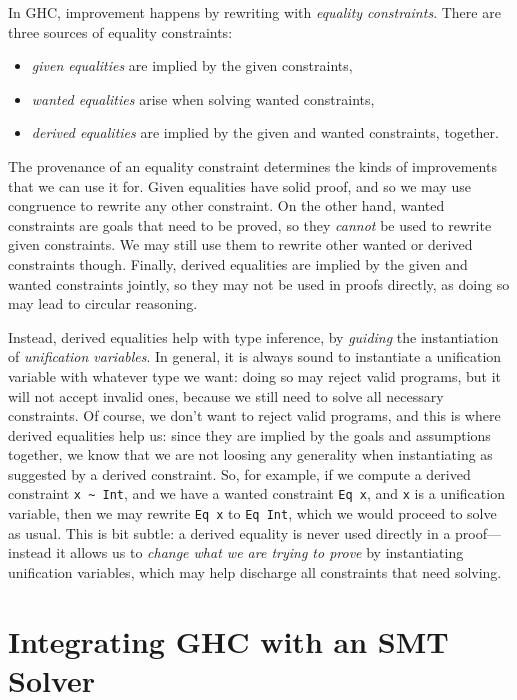 \documentclass{sigplanconf}
\begin{document}
In GHC, improvement happens by rewriting with {\em equality constraints}.
There are three sources of equality constraints:
\begin{itemize}
\item {\em given equalities} are implied by the given constraints,
\item {\em wanted equalities} arise when solving wanted constraints,
\item {\em derived equalities} are implied by the given and wanted constraints,
together.
\end{itemize}

The provenance of an equality constraint determines the kinds of
improvements that we can use it for.  Given equalities have solid proof,
and so we may use congruence to rewrite any other constraint.
On the other hand, wanted constraints are goals that need to be proved,
so they {\em cannot} be used to rewrite given constraints.  We may still
use them to rewrite other wanted or derived constraints though.
Finally, derived equalities are implied by the given and wanted constraints
jointly, so they may not be used in proofs directly,
as doing so may lead to circular reasoning.

Instead, derived equalities help with type inference, by {\em guiding} the
instantiation of {\em unification variables}. In general,
it is always sound to instantiate a unification variable with whatever
type we want: doing so may reject valid programs, but it will not accept
invalid ones, because we still need to solve all necessary constraints.
Of course, we don't want to reject valid programs, and this is where derived
equalities help us: since they are implied by the goals and assumptions
together, we know that we are not loosing any generality when instantiating
as suggested by a derived constraint.  So, for example, if we compute a
derived constraint \Verb"x ~ Int", and we have a wanted constraint
\Verb"Eq x", and \Verb"x" is a unification variable, then we may
rewrite \Verb"Eq x" to \Verb"Eq Int", which we would proceed to solve
as usual.  This is bit subtle:  a derived equality is never used directly
in a proof---instead it allows us to {\em change what we are trying to prove}
by instantiating unification variables, which may help discharge all
constraints that need solving.

\section{Integrating GHC with an SMT Solver}
\label{algorithm}
\end{document}
